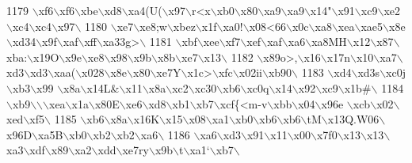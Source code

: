 \begin{DoxyCode}
1179 \textcolor{stringliteral}{\(\backslash\)xf6\(\backslash\)xf6\(\backslash\)xbe\(\backslash\)xd8\(\backslash\)xa4(U(\(\backslash\)x97\(\backslash\)r<x\(\backslash\)xb0\(\backslash\)x80\(\backslash\)xa9\(\backslash\)xa9\(\backslash\)x14"\(\backslash\)x91\(\backslash\)xc9\(\backslash\)xe2\(\backslash\)xc4\(\backslash\)xc4\(\backslash\)x97\(\backslash\)}
1180 \textcolor{stringliteral}{\(\backslash\)xe7\(\backslash\)xe8;w\(\backslash\)xbez\(\backslash\)x1f\(\backslash\)xa0!\(\backslash\)x08<66\(\backslash\)x0c\(\backslash\)xa8\(\backslash\)xea\(\backslash\)xae5\(\backslash\)x8e\(\backslash\)xd34\(\backslash\)x9f\(\backslash\)xaf\(\backslash\)xff\(\backslash\)xa33g>\(\backslash\)}
1181 \textcolor{stringliteral}{\(\backslash\)xbf\(\backslash\)xee\(\backslash\)xf7\(\backslash\)xef\(\backslash\)xaf\(\backslash\)xa6\(\backslash\)xa8MH\(\backslash\)x12\(\backslash\)x87\(\backslash\)xba:\(\backslash\)x19O\(\backslash\)x9e\(\backslash\)xe8\(\backslash\)x98\(\backslash\)x9b\(\backslash\)x8b\(\backslash\)xe7\(\backslash\)x13\(\backslash\)}
1182 \textcolor{stringliteral}{\(\backslash\)x89o>,\(\backslash\)x16\(\backslash\)x17n\(\backslash\)x10\(\backslash\)xa7\(\backslash\)xd3\(\backslash\)xd3\(\backslash\)xaa(\(\backslash\)x028\(\backslash\)x8e\(\backslash\)x80\(\backslash\)xe7Y\(\backslash\)x1c>\(\backslash\)xfc\(\backslash\)x02ii\(\backslash\)xb90\(\backslash\)}
1183 \textcolor{stringliteral}{\(\backslash\)xd4\(\backslash\)xd3s\(\backslash\)xc0j\(\backslash\)xb3\(\backslash\)x99 \(\backslash\)x8a\(\backslash\)x14L&\(\backslash\)x11\(\backslash\)x8a\(\backslash\)xc2\(\backslash\)xc30\(\backslash\)xb6\(\backslash\)xc0q\(\backslash\)x14\(\backslash\)x92\(\backslash\)xc9\(\backslash\)x1b#\(\backslash\)}
1184 \textcolor{stringliteral}{\(\backslash\)xb9\(\backslash\)\(\backslash\)\(\backslash\)xea\(\backslash\)x1a\(\backslash\)x80E\(\backslash\)xe6\(\backslash\)xd8\(\backslash\)xb1\(\backslash\)xb7\(\backslash\)xcf\{<m-v\(\backslash\)xbb\(\backslash\)x04\(\backslash\)x96e \(\backslash\)xcb\(\backslash\)x02\(\backslash\)xed\(\backslash\)xf5\(\backslash\)}
1185 \textcolor{stringliteral}{\(\backslash\)xb6\(\backslash\)x8a\(\backslash\)x16K\(\backslash\)x15\(\backslash\)x08\(\backslash\)xa1\(\backslash\)xb0\(\backslash\)xb6\(\backslash\)xb6\(\backslash\)tM\(\backslash\)x13Q.W06\(\backslash\)x96D\(\backslash\)xa5B\(\backslash\)xb0\(\backslash\)xb2\(\backslash\)xb2\(\backslash\)xa6\(\backslash\)}
1186 \textcolor{stringliteral}{\(\backslash\)xa6\(\backslash\)xd3\(\backslash\)x91\(\backslash\)x11\(\backslash\)x00\(\backslash\)x7f0\(\backslash\)x13\(\backslash\)x13\(\backslash\)xa3\(\backslash\)xdf\(\backslash\)x89\(\backslash\)xa2\(\backslash\)xdd\(\backslash\)xe7ry\(\backslash\)x9b\(\backslash\)t\(\backslash\)xa1`\(\backslash\)xb7\(\backslash\)}

\end{DoxyCode}
